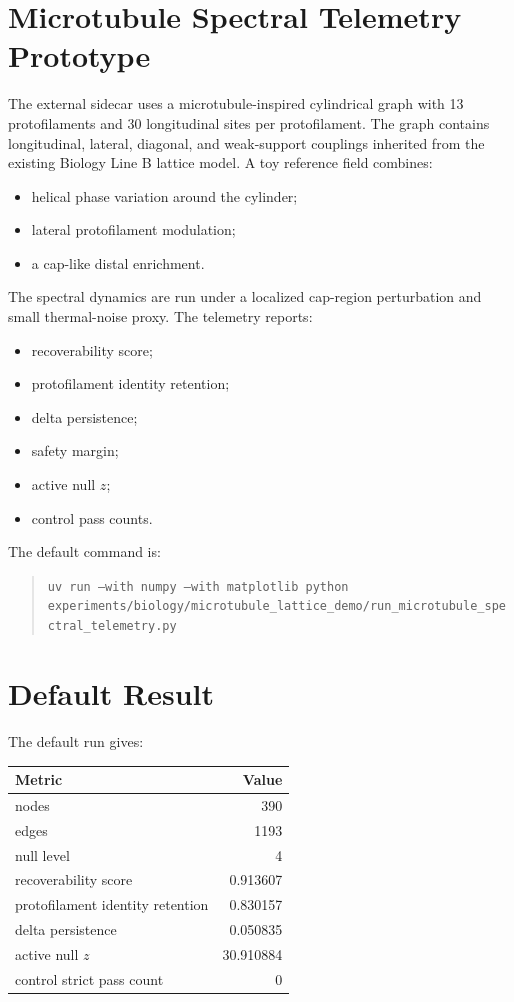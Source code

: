 \documentclass[11pt]{article}
\begin{document}
\section{Microtubule Spectral Telemetry Prototype}

The external sidecar uses a microtubule-inspired cylindrical graph with 13 protofilaments and 30 longitudinal sites per protofilament. The graph contains longitudinal, lateral, diagonal, and weak-support couplings inherited from the existing Biology Line B lattice model. A toy reference field combines:
\begin{itemize}
\item helical phase variation around the cylinder;
\item lateral protofilament modulation;
\item a cap-like distal enrichment.
\end{itemize}

The spectral dynamics are run under a localized cap-region perturbation and small thermal-noise proxy. The telemetry reports:
\begin{itemize}
\item recoverability score;
\item protofilament identity retention;
\item delta persistence;
\item safety margin;
\item active null $z$;
\item control pass counts.
\end{itemize}

The default command is:
\begin{quote}
\texttt{uv run --with numpy --with matplotlib python experiments/biology/microtubule\_lattice\_demo/run\_microtubule\_spectral\_telemetry.py}
\end{quote}

\section{Default Result}

The default run gives:
\begin{center}
\begin{tabular}{lr}
\toprule
Metric & Value \\
\midrule
nodes & 390 \\
edges & 1193 \\
null level & 4 \\
recoverability score & 0.913607 \\
protofilament identity retention & 0.830157 \\
delta persistence & 0.050835 \\
active null $z$ & 30.910884 \\
control strict pass count & 0 \\
\bottomrule
\end{tabular}
\end{center}
\end{document}
